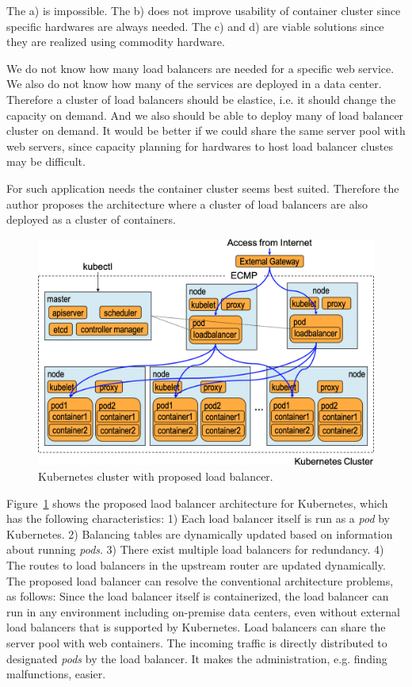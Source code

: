 The a) is impossible. The b) does not improve usability of container cluster since specific hardwares are always needed.
The c) and d) are viable solutions since they are realized using commodity hardware.

We do not know how many load balancers are needed for a specific web service.
We also do not know how many of the services are deployed in a data center.
Therefore a cluster of load balancers should be elastice, i.e. it should change the capacity on demand.
And we also should be able to deploy many of load balancer cluster on demand.
It would be better if we could share the same server pool with web servers, since capacity planning for hardwares to host load balancer clustes may be difficult.

For such application needs the container cluster seems best suited.
Therefore the author proposes the architecture where a cluster of load balancers are also deployed as a cluster of containers.

\begin{figure}
  \centering
  \includegraphics[width=0.8\columnwidth]{Figs/K8sProposed}
  \caption{Kubernetes cluster with proposed load balancer.}
  \label{fig:K8sProposed}
\end{figure}

Figure~\ref{fig:K8sProposed} shows the proposed laod balancer architecture for Kubernetes,
which has the following characteristics:
1) Each load balancer itself is run as a {\em pod} by Kubernetes. 
2) Balancing tables are dynamically updated based on information about running {\em pods}.
3) There exist multiple load balancers for redundancy.
4) The routes to load balancers in the upstream router are updated dynamically.
The proposed load balancer can resolve the conventional architecture problems, as follows:
Since the load balancer itself is containerized, the load balancer can run in any environment including on-premise data centers, even without external load balancers that is supported by Kubernetes.
Load balancers can share the server pool with web containers.
The incoming traffic is directly distributed to designated {\em pods} by the load balancer. 
It makes the administration, e.g. finding malfunctions, easier.

